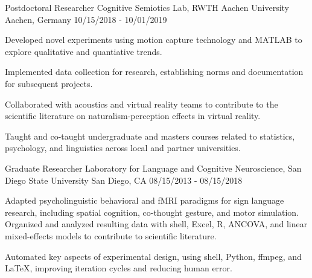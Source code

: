 \begin{cventries}
{\begin{cvitems}
      \end{cvitems}
    }
\vspace{\baselineskip}
  \cventry
    {Postdoctoral Researcher}
    {Cognitive Semiotics Lab, RWTH Aachen University}
    {Aachen, Germany}
    {10/15/2018 - 10/01/2019}
    {
      \begin{cvitems}
        \item{Developed novel experiments using motion capture technology and
          MATLAB to explore qualitative and quantiative trends.}
        \item{Implemented data collection for research, establishing norms and
          documentation for subsequent projects.}
        \item{Collaborated with acoustics and virtual reality teams to contribute
          to the scientific literature on naturalism-perception effects in virtual reality.}
        \item{Taught and co-taught undergraduate and masters courses related to
          statistics, psychology, and linguistics across local and partner universities.}
      \end{cvitems}
    }
\vspace{\baselineskip}
  \cventry
    {Graduate Researcher}
    {Laboratory for Language and Cognitive Neuroscience, San Diego State University}
    {San Diego, CA}
    {08/15/2013 - 08/15/2018}
    {
      \begin{cvitems}
        \item {Adapted psycholinguistic behavioral and fMRI paradigms for sign
          language research, including spatial cognition, co-thought gesture,
          and motor simulation. Organized and analyzed resulting data with shell,
          Excel, R, ANCOVA, and linear mixed-effects models to contribute to
          scientific literature.}
        \item {Automated key aspects of experimental design,
          using shell, Python, ffmpeg, and \LaTeX, improving iteration
          cycles and reducing human error.}

\end{cvitems}}
\end{cventries}
